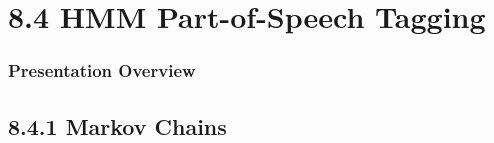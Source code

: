 \documentclass[13.5pt,aspecratio=169]{beamer}
\begin{document}
\section{8.4 HMM Part-of-Speech Tagging} %
\begin{frame}
	\frametitle{Presentation Overview} %
	\tableofcontents[currentsection]
\end{frame}

        
	
    

\subsection{8.4.1 Markov Chains}
\end{document}
